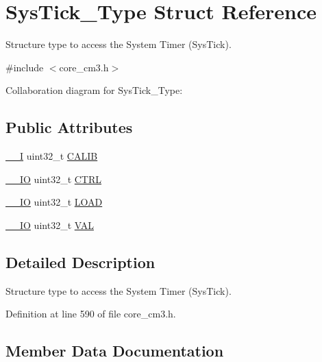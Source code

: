 \hypertarget{structSysTick__Type}{}\section{Sys\+Tick\+\_\+\+Type Struct Reference}
\label{structSysTick__Type}


Structure type to access the System Timer (Sys\+Tick).  




{\ttfamily \#include $<$core\+\_\+cm3.\+h$>$}



Collaboration diagram for Sys\+Tick\+\_\+\+Type\+:
\subsection*{Public Attributes}
\begin{DoxyCompactItemize}
\item 
\hyperlink{core__cm3_8h_af63697ed9952cc71e1225efe205f6cd3}{\+\_\+\+\_\+I} uint32\+\_\+t \hyperlink{structSysTick__Type_a9c9eda0ea6f6a7c904d2d75a6963e238}{C\+A\+L\+IB}
\item 
\hyperlink{core__cm3_8h_aec43007d9998a0a0e01faede4133d6be}{\+\_\+\+\_\+\+IO} uint32\+\_\+t \hyperlink{structSysTick__Type_af2ad94ac83e5d40fc6e34884bc1bec5f}{C\+T\+RL}
\item 
\hyperlink{core__cm3_8h_aec43007d9998a0a0e01faede4133d6be}{\+\_\+\+\_\+\+IO} uint32\+\_\+t \hyperlink{structSysTick__Type_ae7bc9d3eac1147f3bba8d73a8395644f}{L\+O\+AD}
\item 
\hyperlink{core__cm3_8h_aec43007d9998a0a0e01faede4133d6be}{\+\_\+\+\_\+\+IO} uint32\+\_\+t \hyperlink{structSysTick__Type_a0997ff20f11817f8246e8f0edac6f4e4}{V\+AL}
\end{DoxyCompactItemize}


\subsection{Detailed Description}
Structure type to access the System Timer (Sys\+Tick). 

Definition at line 590 of file core\+\_\+cm3.\+h.



\subsection{Member Data Documentation}
